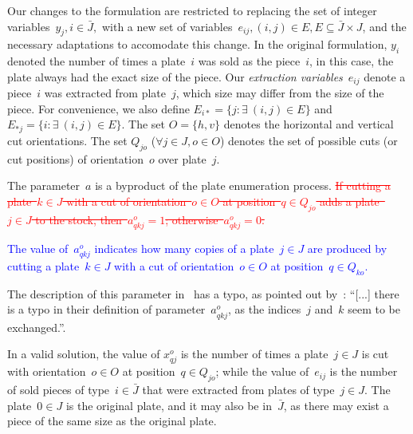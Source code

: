 \documentclass[smallextended]{svjour3}       %
\newif\iffinalversion
\newcommand{\newtext}[1]{\iffinalversion%
#1%
\else%
\textcolor{blue}{#1}%
\fi%
}
\newcommand{\oldtext}[1]{\iffinalversion%
#1%
\else%
\textcolor{red}{\sout{#1}}%
\fi%
}
\begin{document}
Our changes to the formulation are restricted to replacing the set of integer variables~\(y_j, i \in \bar{J},\) with a new set of variables~\(e_{ij}, (i, j) \in E, E \subseteq \bar{J} \times J\), and the necessary adaptations to accomodate this change.
In the original formulation, \(y_i\) denoted the number of times a plate~\(i\) was sold as the piece~\(i\), in this case, the plate always had the exact size of the piece.
Our \emph{extraction variables}~\(e_{ij}\) denote a piece~\(i\) was extracted from plate~\(j\), which size may differ from the size of the piece.
For convenience, we also define \(E_{i*} = \{ j : \exists~(i, j) \in E \}\) and \(E_{*j} = \{i : \exists~(i, j) \in E \}\).
The set \(O = \{h, v\}\) denotes the horizontal and vertical cut orientations.
The set \(Q_{jo}\) (\(\forall j \in J, o \in O\)) denotes the set of possible cuts (or cut positions) of orientation~\(o\) over plate~\(j\).

The parameter~\(a\) is a byproduct of the plate enumeration process.
\oldtext{If cutting a plate~\(k \in J\) with a cut of orientation~\(o \in O\) at position~\(q \in Q_{jo}\) adds a plate~\(j \in J\) to the stock, then~\(a^o_{qkj} = 1\); otherwise~\(a^o_{qkj} = 0\).}
\newtext{The value of~\(a^o_{qkj}\) indicates how many copies of a plate~\(j \in J\) are produced by cutting a plate~\(k \in J\) with a cut of orientation~\(o \in O\) at position~\(q \in Q_{ko}\).}
The description of this parameter in~\cite{furini:2016} has a typo, as pointed out by~\cite{martin:2020}:
``[...] there is a typo in their definition of parameter~\(a^o_{qkj}\), as the indices~\(j\) and~\(k\) seem to be exchanged.''.

In a valid solution, the value of \(x^o_{qj}\) is the number of times a plate~\(j \in J\) is cut with orientation~\(o \in O\) at position~\(q \in Q_{jo}\); while the value of~\(e_{ij}\) is the number of sold pieces of type~\(i \in \bar{J}\) that were extracted from plates of type~\(j \in J\).
The plate~\(0 \in J\) is the original plate, and it may also be in~\(\bar{J}\), as there may exist a piece of the same size as the original plate.
\end{document}

